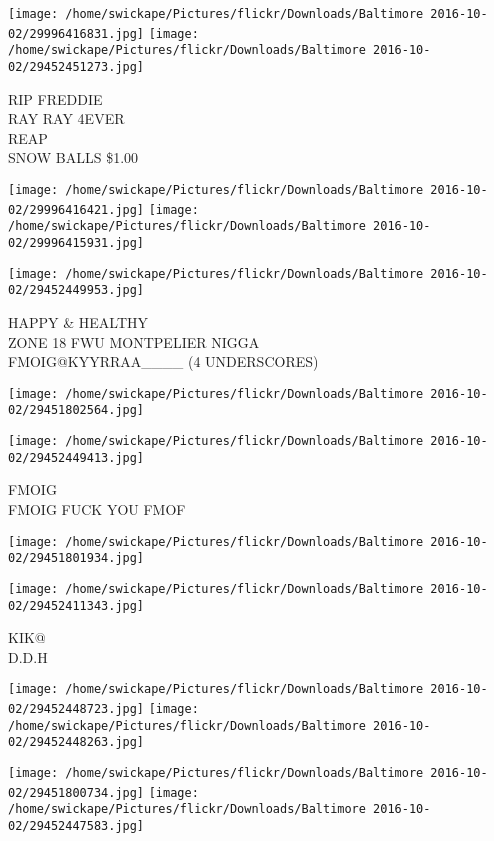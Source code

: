 \documentclass[10pt,letterpaper]{article}
\begin{document}
\texttt{[image: /home/swickape/Pictures/flickr/Downloads/Baltimore 2016-10-02/29996416831.jpg]}
\texttt{[image: /home/swickape/Pictures/flickr/Downloads/Baltimore 2016-10-02/29452451273.jpg]}

RIP FREDDIE\\
RAY RAY 4EVER\\
REAP\\
SNOW BALLS \$1.00
\pagebreak

\texttt{[image: /home/swickape/Pictures/flickr/Downloads/Baltimore 2016-10-02/29996416421.jpg]}
\texttt{[image: /home/swickape/Pictures/flickr/Downloads/Baltimore 2016-10-02/29996415931.jpg]}

\vspace{0.25in}
\texttt{[image: /home/swickape/Pictures/flickr/Downloads/Baltimore 2016-10-02/29452449953.jpg]}

HAPPY \& HEALTHY\\
ZONE 18 FWU MONTPELIER NIGGA\\
FMOIG@KYYRRAA\_\_\_\_ (4 UNDERSCORES)
\pagebreak

\texttt{[image: /home/swickape/Pictures/flickr/Downloads/Baltimore 2016-10-02/29451802564.jpg]}

\vspace{0.25in}
\texttt{[image: /home/swickape/Pictures/flickr/Downloads/Baltimore 2016-10-02/29452449413.jpg]}

FMOIG\\
FMOIG FUCK YOU FMOF
\pagebreak

\texttt{[image: /home/swickape/Pictures/flickr/Downloads/Baltimore 2016-10-02/29451801934.jpg]}

\vspace{0.25in}
\texttt{[image: /home/swickape/Pictures/flickr/Downloads/Baltimore 2016-10-02/29452411343.jpg]}

KIK@\\
D.D.H
\pagebreak

\texttt{[image: /home/swickape/Pictures/flickr/Downloads/Baltimore 2016-10-02/29452448723.jpg]}
\texttt{[image: /home/swickape/Pictures/flickr/Downloads/Baltimore 2016-10-02/29452448263.jpg]}

\texttt{[image: /home/swickape/Pictures/flickr/Downloads/Baltimore 2016-10-02/29451800734.jpg]}
\texttt{[image: /home/swickape/Pictures/flickr/Downloads/Baltimore 2016-10-02/29452447583.jpg]}
\end{document}
